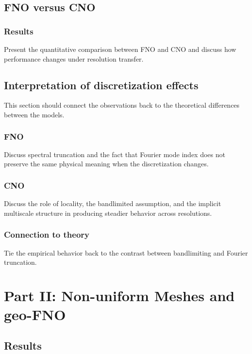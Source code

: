 \subsection{FNO versus CNO}

\subsubsection{Results}

Present the quantitative comparison between FNO and CNO and discuss how
performance changes under resolution transfer.

\subsection{Interpretation of discretization effects}

This section should connect the observations back to the theoretical
differences between the models.

\subsubsection{FNO}

Discuss spectral truncation and the fact that Fourier mode index does
not preserve the same physical meaning when the discretization changes.

\subsubsection{CNO}

Discuss the role of locality, the bandlimited assumption, and the
implicit multiscale structure in producing steadier behavior across
resolutions.

\subsubsection{Connection to theory}

Tie the empirical behavior back to the contrast between bandlimiting
and Fourier truncation.

\section{Part II: Non-uniform Meshes and geo-FNO}

\subsection{Results}

